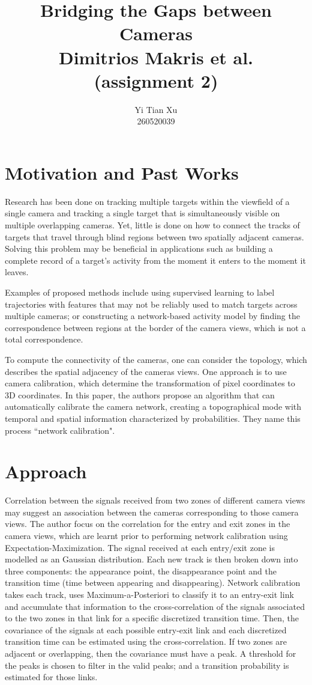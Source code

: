 \documentclass[10pt]{article}
\title{Bridging the Gaps between Cameras\\Dimitrios Makris et al.\\(assignment 2)}
\author{Yi Tian Xu\\260520039}
\begin{document}
\maketitle

\section{Motivation and Past Works}
Research has been done on tracking multiple targets within the viewfield of a single camera and tracking a single target that is simultaneously visible on multiple overlapping cameras. Yet, little is done on how to connect the tracks of targets that travel through blind regions between two spatially adjacent cameras. Solving this problem may be beneficial in applications such as building a complete record of a target's activity from the moment it enters to the moment it leaves. 

Examples of proposed methods include using supervised learning to label trajectories with features that may not be reliably used to match targets across multiple cameras; or constructing a network-based activity model by finding the correspondence between regions at the border of the camera views, which is not a total correspondence. 

To compute the connectivity of the cameras, one can consider the topology, which describes the spatial adjacency of the cameras views. One approach is to use camera calibration, which determine the transformation of pixel coordinates to 3D coordinates. In this paper, the authors propose an algorithm that can automatically calibrate the camera network, creating a topographical mode with temporal and spatial information characterized by probabilities. They name this process ``network calibration".

\section{Approach}

Correlation between the signals received from two zones of different camera views may suggest an association between the cameras corresponding to those camera views. The author focus on the correlation for the entry and exit zones in the camera views, which are learnt prior to performing network calibration using Expectation-Maximization. The signal received at each entry/exit zone is modelled as an Gaussian distribution. Each new track is then broken down into three components: the appearance point, the disappearance point and the transition time (time between appearing and disappearing). Network calibration takes each track, uses Maximum-a-Posteriori to classify it to an entry-exit link and accumulate that information to the cross-correlation of the signals associated to the two zones in that link for a specific discretized transition time. Then, the covariance of the signals at each possible entry-exit link and each discretized transition time can be estimated using the cross-correlation. If two zones are adjacent or overlapping, then the covariance must have a peak. A threshold for the peaks is chosen to filter in the valid peaks; and a transition probability is estimated for those links.
\end{document}
